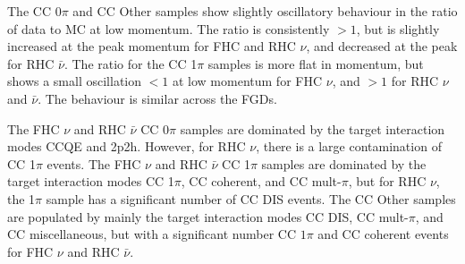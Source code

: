The CC 0$\pi$ and CC Other samples show slightly oscillatory behaviour in the ratio of data to MC at low momentum. The ratio is consistently $>1$, but is slightly increased at the peak momentum for FHC and RHC $\nu$, and decreased at the peak for RHC $\bar{\nu}$. The ratio for the CC 1$\pi$ samples is more flat in momentum, but shows a small oscillation $<1$ at low momentum for FHC $\nu$, and $>1$ for RHC $\nu$ and $\bar{\nu}$. The behaviour is similar across the FGDs.

The FHC $\nu$ and RHC $\bar{\nu}$ CC 0$\pi$ samples are dominated by the target interaction modes CCQE and 2p2h. However, for RHC $\nu$, there is a large contamination of CC 1$\pi$ events. The FHC $\nu$ and RHC $\bar{\nu}$ CC 1$\pi$ samples are dominated by the target interaction modes CC 1$\pi$, CC coherent, and CC mult-$\pi$, but for RHC $\nu$, the 1$\pi$ sample has a significant number of CC DIS events. The CC Other samples are populated by mainly the target interaction modes CC DIS, CC mult-$\pi$, and CC miscellaneous, but with a significant number CC $1\pi$ and CC coherent events for FHC $\nu$ and RHC $\bar{\nu}$.

